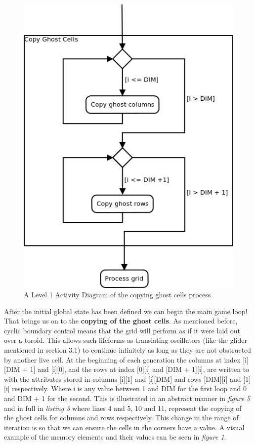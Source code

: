 \documentclass[11pt]{article} %
\begin{document}
\begin{figure}[h]
\centering
\includegraphics[scale=0.5]{sequentialGhost.png}
\caption{A Level 1 Activity Diagram of the copying ghost cells process}
\label{fig: Algo1}
\end{figure}After the initial global state has been defined we can begin the main game loop! That brings us on to the {\bf copying of the ghost cells}. As mentioned before, cyclic boundary control means that the grid will perform as if it were laid out over a toroid. This allows such lifeforms as translating oscillators (like the glider mentioned in section 3.1) to continue infinitely as long as they are not obstructed by another live cell. At the beginning of each generation the columns at index [i][DIM + 1] and [i][0], and the rows at index [0][i] and [DIM + 1][i], are written to with the attributes stored in columns [i][1] and [i][DIM] and rows [DIM][i] and [1][i] respectively. Where i is any value between 1 and DIM for the first loop and 0 and DIM + 1 for the second. This is illustrated in an abstract manner in {\it figure 5} and in full in {\it listing 3} where lines 4 and 5, 10 and 11, represent the copying of the ghost cells for columns and rows respectively. This change in the range of iteration is so that we can ensure the cells in the corners have a value. A visual example of the memory elements and their values can be seen in {\it figure 1}. 
\end{document}
